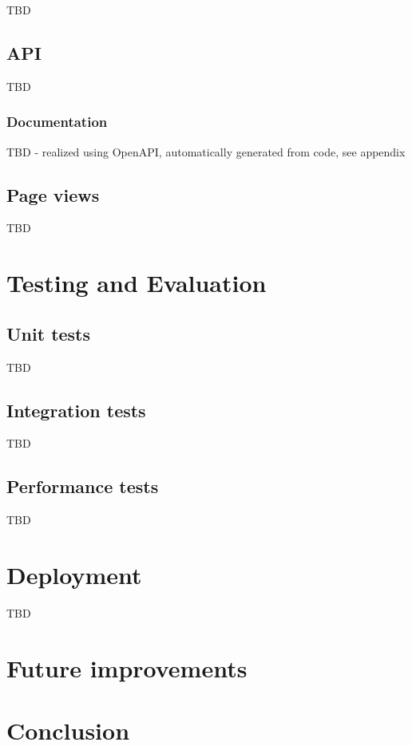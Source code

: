 \documentclass[
  digital,     %
  oneside,     %
  nosansbold,  %
  nocolorbold, %
  lof,         %
  lot,         %
]{fithesis4}
\begin{document}
TBD

\section{API}
\label{sec:data-collection-mechanism}

TBD

\subsection{Documentation}
TBD - realized using OpenAPI, automatically generated from code, see appendix

\section{Page views}
\label{sec:page-views}

TBD


\chapter{Testing and Evaluation}

\section{Unit tests}
\label{sec:unit-tests}
TBD

\section{Integration tests}
\label{sec:integration-tests}
TBD

\section{Performance tests}
\label{sec:performance-tests}
TBD


\chapter{Deployment}
TBD

\chapter{Future improvements}


\chapter*{Conclusion}
\end{document}
